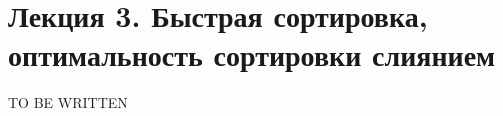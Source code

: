 \documentclass[../main.tex]{subfiles}
\begin{document}
	\section{Лекция 3. Быстрая сортировка, оптимальность сортировки слиянием}
	
	\begin{center}
		\huge TO BE WRITTEN
	\end{center}
	
	
	\pagebreak	
\end{document}
